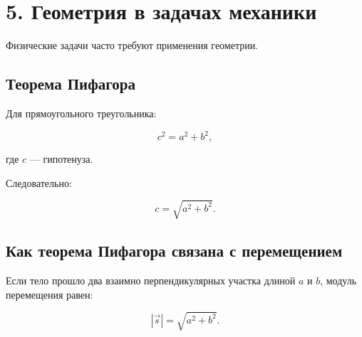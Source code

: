 \documentclass[a4paper,12pt]{article}
\begin{document}

\section*{5. Геометрия в задачах механики}

Физические задачи часто требуют применения геометрии.

\subsection*{Теорема Пифагора}

Для прямоугольного треугольника:

\[
c^2=a^2+b^2,
\]

где $c$ --- гипотенуза.

Следовательно:

\[
c=\sqrt{a^2+b^2}.
\]

\begin{center}
\end{center}

\subsection*{Как теорема Пифагора связана с перемещением}

Если тело прошло два взаимно перпендикулярных участка
длиной $a$ и $b$, модуль перемещения равен:

\[
|\vec{s}|=\sqrt{a^2+b^2}.
\]
\end{document}

